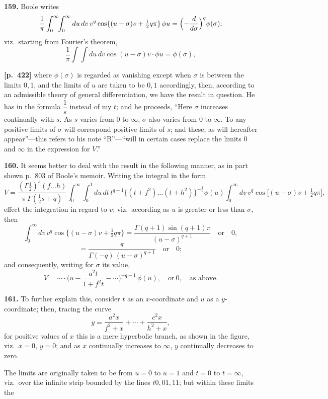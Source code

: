 \documentclass[11pt,a4paper]{article}
\begin{document}
\textbf{159.} Boole writes
\[
\frac{1}{\pi}\int_{0}^{\infty}\!\!\int_{0}^{\infty} du\,dv\,v^{q}\cos\{(u-\sigma)v + \tfrac{1}{2}q\pi\}\,\phi u = \Bigl(-\frac{d}{d\sigma}\Bigr)^{q}\phi(\sigma);
\]
viz.\ starting from Fourier's theorem,
\[
\frac{1}{\pi}\int\!\!\int du\,dv\cos(u-\sigma)v\cdot\phi u = \phi(\sigma),
\]

\bigskip
\noindent\textbf{[p.~422]}\quad
where $\phi(\sigma)$ is regarded as vanishing except when $\sigma$ is between the limits $0,1$, and the limits of $u$ are taken to be $0,1$ accordingly, then, according to an admissible theory of general differentiation, we have the result in question. He has in the formula $\dfrac{1}{s}$ instead of my $t$; and he proceeds, ``Here $\sigma$ increases continually with $s$. As $s$ varies from $0$ to $\infty$, $\sigma$ also varies from $0$ to $\infty$. To any positive limits of $\sigma$ will correspond positive limits of $s$; and these, as will hereafter appear''---this refers to his note ``B''---``will in certain cases replace the limits $0$ and $\infty$ in the expression for $V$.''

\textbf{160.} It seems better to deal with the result in the following manner, as in part shown p.~803 of Boole's memoir. Writing the integral in the form
\[
V = \frac{(\Gamma\tfrac{1}{2})^{s}(f\ldots h)}{\pi\,\Gamma(\tfrac{1}{2}s+q)}\int_{0}^{\infty}\!\!\int_{0}^{1} du\,dt\,t^{q-1}\bigl\{(t+f^{2})\ldots(t+h^{2})\bigr\}^{-\tfrac{1}{2}}\phi(u)\int_{0}^{\infty} dv\,v^{q}\cos\bigl[(u-\sigma)v + \tfrac{1}{2}q\pi\bigr],
\]
effect the integration in regard to $v$; viz.\ according as $u$ is greater or less than $\sigma$, then
\[
\int_{0}^{\infty} dv\,v^{q}\cos\{(u-\sigma)v + \tfrac{1}{2}q\pi\} = \frac{\Gamma(q+1)\sin(q+1)\pi}{(u-\sigma)^{q+1}}\quad\text{or}\quad 0,
\]
\[
= \frac{\pi}{\Gamma(-q)\,(u-\sigma)^{q+1}}\quad\text{or}\quad 0;
\]
and consequently, writing for $\sigma$ its value,
\[
V = \cdots\cdot\bigl(u - \frac{a^{2}t}{1+f^{2}t} - \cdots\bigr)^{-q-1}\,\phi(u),\quad\text{or}\ 0,\quad\text{as above.}
\]

\textbf{161.} To further explain this, consider $t$ as an $x$-coordinate and $u$ as a $y$-coordinate; then, tracing the curve
\[
y = \frac{a^{2}x}{f^{2} + x} + \cdots + \frac{c^{2}x}{h^{2} + x},
\]
for positive values of $x$ this is a mere hyperbolic branch, as shown in the figure, viz.\ $x = 0$, $y = 0$; and as $x$ continually increases to $\infty$, $y$ continually decreases to zero.

The limits are originally taken to be from $u = 0$ to $u = 1$ and $t = 0$ to $t = \infty$, viz.\ over the infinite strip bounded by the lines $t0,01,11$; but within these limits the
\end{document}
